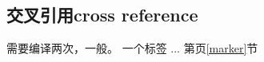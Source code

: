 \documentclass[UTF8]{article}
\begin{document}
\subsection{交叉引用cross reference}
需要编译两次，一般。
一个标签\label{marker}
...
第\pageref{marker}页\ref{marker}节




























	
\end{document}

